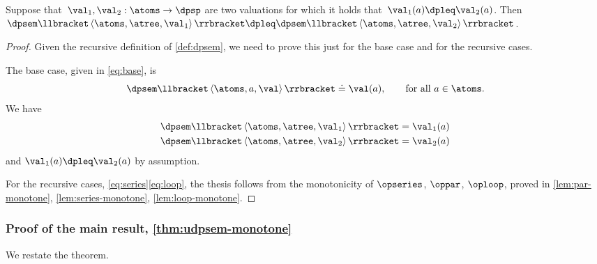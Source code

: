 \begin{lemma}
\label{lem:dpsem-monotone}Suppose that~$\val_{1},\val_{2}:\atoms\rightarrow\dpsp$
are two valuations for which it holds that~$\val_{1}(a)\dpleq\val_{2}(a)$.
Then~$\dpsem\llbracket\left\langle \atoms,\atree,\val_{1}\right\rangle \rrbracket\dpleq\dpsem\llbracket\left\langle \atoms,\atree,\val_{2}\right\rangle \rrbracket$.
\end{lemma}
\begin{proof}
Given the recursive definition of \cref{def:dpsem}, we need
to prove this just for the base case and for the recursive cases.

The base case, given in \eqref{eq:base}, is
\[
\dpsem\llbracket\left\langle \atoms,a,\val\right\rangle \rrbracket\doteq\val(a),\qquad\text{for all}\ a\in\atoms.
\]
We have
\begin{align*}
\dpsem\llbracket\left\langle \atoms,\atree,\val_{1}\right\rangle \rrbracket & =\val_{1}(a)\\
\dpsem\llbracket\left\langle \atoms,\atree,\val_{2}\right\rangle \rrbracket & =\val_{2}(a)
\end{align*}
and $\val_{1}(a)\dpleq\val_{2}(a)$ by assumption.

For the recursive cases, \eqref{eq:series}\textendash \eqref{eq:loop},
the thesis follows from the monotonicity of $\opseries$, $\oppar$,
$\oploop$, proved in \cref{lem:par-monotone}, \cref{lem:series-monotone},
\cref{lem:loop-monotone}.
\end{proof}

\subsubsection{Proof of the main result, \cref{thm:udpsem-monotone}}

\label{subsec:proof-main-result}

We restate the theorem.

